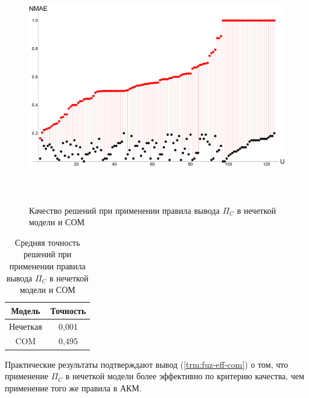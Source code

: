 \begin{figure}[H]
	\caption{Качество решений при применении правила вывода $\Pi_{C}$ в нечеткой модели и СОМ}
	\label{pic:predpio}
	\begin{center}
		\includegraphics[width=7in,height=4in]{pics/results/ub_method_in_ub_and_fuzz_model.pdf}
\end{center}
\end{figure}

\begin{table}[H]
	\caption{Средняя точность решений при применении правила вывода $\Pi_{C}$ в нечеткой модели и СОМ}
  \label{tbl:predhamming}
  \begin{center}
	\begin{tabular}{|c|c|}
	  \hline
		Модель& Точность \\ \hline
		Нечеткая&0,001 \\ \hline
		COM&0,495\\ \hline
	\end{tabular}
  \end{center}
\end{table}

Практические результаты подтверждают вывод (\ref{trm:fuz-eff-com}) о том, что
применение $\Pi_C$ в нечеткой модели более эффективно по критерию качества,
чем применение того же правила в АКМ.

